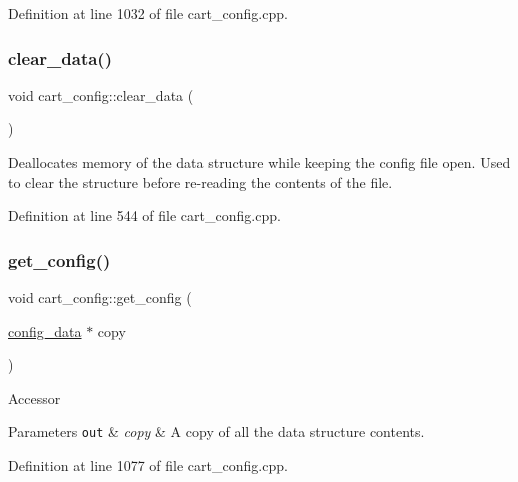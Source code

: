 Definition at line 1032 of file cart\+\_\+config.\+cpp.

\mbox{\label{classcart__config_a2e952dab59fce74b82bad81a3cf41ee2}} 
\subsubsection{\texorpdfstring{clear\+\_\+data()}{clear\_data()}}
{\footnotesize\ttfamily void cart\+\_\+config\+::clear\+\_\+data (\begin{DoxyParamCaption}{ }\end{DoxyParamCaption})}

Deallocates memory of the data structure while keeping the config file open. Used to clear the structure before re-\/reading the contents of the file. 

Definition at line 544 of file cart\+\_\+config.\+cpp.

\mbox{\label{classcart__config_ab4ae31c21f8865a8fe0db542c5de0a15}} 
\subsubsection{\texorpdfstring{get\+\_\+config()}{get\_config()}}
{\footnotesize\ttfamily void cart\+\_\+config\+::get\+\_\+config (\begin{DoxyParamCaption}\item[{\mbox{\hyperlink{structconfig__data}{config\+\_\+data}} $\ast$}]{copy }\end{DoxyParamCaption})}

Accessor 
\begin{DoxyParams}[1]{Parameters}
\mbox{\tt out}  & {\em copy} & A copy of all the data structure contents. \\
\hline
\end{DoxyParams}


Definition at line 1077 of file cart\+\_\+config.\+cpp.

\mbox{\label{classcart__config_a3f52caad207b08c3b48554fcb2abb8a3}} 
